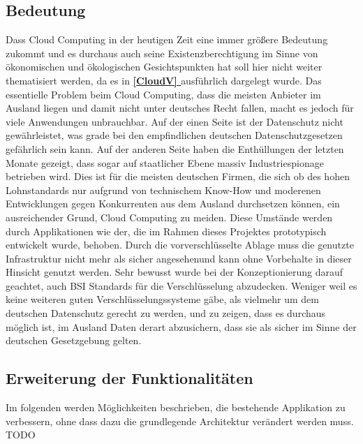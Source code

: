 \documentclass[12pt,a4paper,bibliography=totocnumbered,listof=totocnumbered]{scrartcl}
\newcommand*{\fullref}[1]{\textbf{\hyperref[{#1}]{\ref*{#1} \nameref*{#1}}}}
\begin{document}
\subsection{Bedeutung}
Dass Cloud Computing in der heutigen Zeit eine immer größere Bedeutung zukommt und es durchaus auch seine Existenzberechtigung im Sinne von ökonomischen und ökologischen Gesichtspunkten hat soll hier nicht weiter thematisiert werden, da es in \fullref{CloudV} ausführlich dargelegt wurde. Das essentielle Problem beim Cloud Computing, dass die meisten Anbieter im Ausland liegen und damit nicht unter deutsches Recht fallen, macht es jedoch für viele Anwendungen unbrauchbar. Auf der einen Seite ist der Datenschutz nicht gewährleistet, was grade bei den empfindlichen deutschen Datenschutzgesetzen gefährlich sein kann. Auf der anderen Seite haben die Enthüllungen der letzten Monate gezeigt, dass sogar auf staatlicher Ebene massiv Industriespionage betrieben wird. Dies ist für die meisten deutschen Firmen, die sich ob des hohen Lohnstandards nur aufgrund von technischem Know-How und moderenen Entwicklungen gegen Konkurrenten aus dem Ausland durchsetzen können, ein ausreichender Grund, Cloud Computing zu meiden. Diese Umstände werden durch Applikationen wie der, die im Rahmen dieses Projektes prototypisch entwickelt wurde, behoben. Durch die vorverschlüsselte Ablage muss die genutzte Infrastruktur nicht mehr als sicher angesehenund kann ohne Vorbehalte in dieser Hinsicht genutzt werden. Sehr bewusst wurde bei der Konzeptionierung darauf geachtet, auch BSI Standards für die Verschlüsselung abzudecken. Weniger weil es keine weiteren guten Verschlüsselungssysteme gäbe, als vielmehr um dem deutschen Datenschutz gerecht zu werden, und zu zeigen, dass es durchaus möglich ist, im Ausland Daten derart abzusichern, dass sie als sicher im Sinne der deutschen Gesetzgebung gelten.

\subsection{Erweiterung der Funktionalitäten}
Im folgenden werden Möglichkeiten beschrieben, die bestehende Applikation zu verbessern, ohne dass dazu die grundlegende Architektur verändert werden muss. TODO
\end{document}
